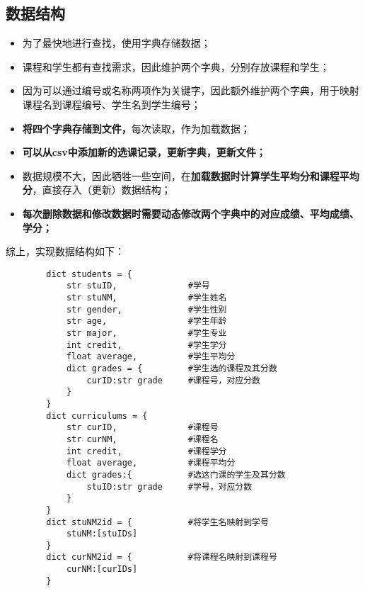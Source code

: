 \documentclass[UTF8]{ctexart}
\begin{document}
    \subsection{数据结构}
    \begin{itemize}
        \item 为了最快地进行查找，使用字典存储数据；
        \item 课程和学生都有查找需求，因此维护两个字典，分别存放课程和学生；
        \item 因为可以通过编号或名称两项作为关键字，因此额外维护两个字典，用于映射课程名到课程编号、学生名到学生编号；
        \item \textbf{将四个字典存储到文件，}每次读取，作为加载数据；
        \item \textbf{可以从csv中添加新的选课记录，更新字典，更新文件；}
        \item 数据规模不大，因此牺牲一些空间，在\textbf{加载数据时计算学生平均分和课程平均分}，直接存入（更新）数据结构；
        \item \textbf{每次删除数据和修改数据时需要动态修改两个字典中的对应成绩、平均成绩、学分；}
    \end{itemize}
    \par 综上，实现数据结构如下：
    \begin{lstlisting}
        dict students = {
            str stuID,              #学号
            str stuNM,              #学生姓名
            str gender,             #学生性别
            str age,                #学生年龄
            str major,              #学生专业
            int credit,             #学生学分
            float average,          #学生平均分
            dict grades = {         #学生选的课程及其分数
                curID:str grade     #课程号，对应分数
            }
        }
        dict curriculums = {             
            str curID,              #课程号
            str curNM,              #课程名
            int credit,             #课程学分
            float average,          #课程平均分
            dict grades:{           #选这门课的学生及其分数
                stuID:str grade     #学号，对应分数
            }
        }
        dict stuNM2id = {           #将学生名映射到学号
            stuNM:[stuIDs]           
        }
        dict curNM2id = {           #将课程名映射到课程号
            curNM:[curIDs]           
        }
    \end{lstlisting}
\end{document}
